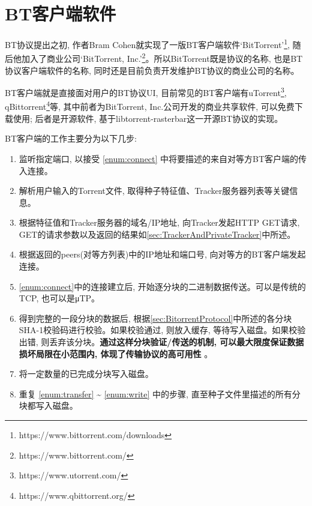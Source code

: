 \section{BT客户端软件}

BT协议提出之初, 作者Bram Cohen就实现了一版BT客户端软件`BitTorrent'\footnote{https://www.bittorrent.com/downloads}, 随后他加入了商业公司`BitTorrent, Inc.'\footnote{https://www.bittorrent.com/}。所以BitTorrent既是协议的名称, 也是BT协议客户端软件的名称, 同时还是目前负责开发维护BT协议的商业公司的名称。

BT客户端就是直接面对用户的BT协议UI, 目前常见的BT客户端有uTorrent\footnote{https://www.utorrent.com/}, qBittorrent\footnote{https://www.qbittorrent.org/}等, 其中前者为BitTorrent, Inc.公司开发的商业共享软件, 可以免费下载使用; 后者是开源软件, 基于libtorrent-rasterbar这一开源BT协议的实现。

BT客户端的工作主要分为以下几步:

\begin{enumerate}[label=\arabic*),leftmargin=*]
\item 监听指定端口, 以接受 \ref{enum:connect} 中将要描述的来自对等方BT客户端的传入连接。

\item 解析用户输入的Torrent文件, 取得种子特征值、Tracker服务器列表等关键信息。

\item 根据特征值和Tracker服务器的域名/IP地址, 向Tracker发起HTTP GET请求, GET的请求参数以及返回的结果如\ref{sec:TrackerAndPrivateTracker}中所述。

\item \label{enum:connect}根据返回的peers(对等方列表)中的IP地址和端口号, 向对等方的BT客户端发起连接。

\item \label{enum:transfer} \ref{enum:connect}中的连接建立后, 开始逐分块的二进制数据传送。可以是传统的TCP, 也可以是μTP。

\item 得到完整的一段分块的数据后, 根据\ref{sec:BitorrentProtocol}中所述的各分块SHA-1校验码进行校验。如果校验通过, 则放入缓存, 等待写入磁盘。如果校验出错, 则丢弃该分块。\textbf{通过这样分块验证/传送的机制, 可以最大限度保证数据损坏局限在小范围内, 体现了传输协议的高可用性}
。

\item \label{enum:write}将一定数量的已完成分块写入磁盘。

\item 重复 \ref{enum:transfer} \~{} \ref{enum:write} 中的步骤, 直至种子文件里描述的所有分块都写入磁盘。
\end{enumerate}




